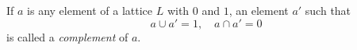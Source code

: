 If $a$ is any element of a lattice $L$ with $0$ and $1$, an element $a'$ such that
$$a \cup a' = 1, \quad a \cap a' = 0$$
is called a \emph{complement} of $a$.
